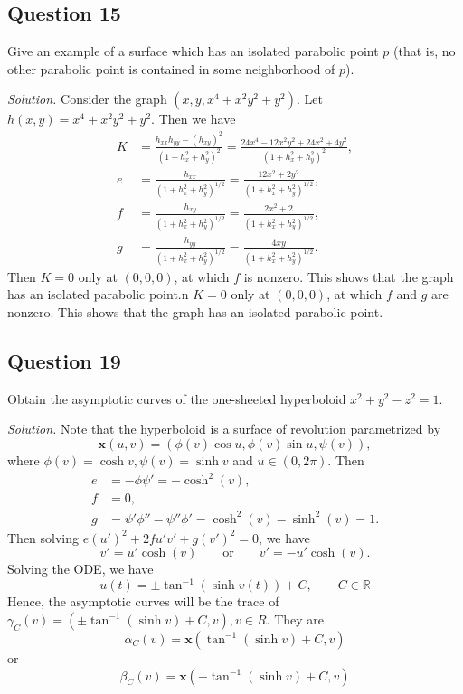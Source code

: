 \documentclass[12pt]{article}
\begin{document}
\subsection*{Question 15}
Give an example of a surface which has an isolated parabolic point $p$ (that is, no other parabolic point is contained in some neighborhood of $p$).

\textit{Solution.} Consider the graph $(x,y,x^4+x^2y^2+y^2)$. Let $h(x,y)=x^4+x^2y^2+y^2$. Then we have\begin{align*}
    K &= \frac{h_{xx}h_{yy}-(h_{xy})^2}{(1+h_x^2+h_y^2)^2} = \frac{24x^4-12x^2y^2+24x^2+4y^2}{(1+h_x^2+h_y^2)^2},\\
    e &= \frac{h_{xx}}{(1+h_x^2+h_y^2)^{1/2}}=\frac{12x^2+2y^2}{(1+h_x^2+h_y^2)^{1/2}},\\
    f &= \frac{h_{xy}}{(1+h_x^2+h_y^2)^{1/2}}=\frac{2x^2+2}{(1+h_x^2+h_y^2)^{1/2}},\\
    g &= \frac{h_{yy}}{(1+h_x^2+h_y^2)^{1/2}}=\frac{4xy}{(1+h_x^2+h_y^2)^{1/2}}.
\end{align*}
 Then $K=0$ only at $(0,0,0)$, at which $f$ is nonzero. This shows that the graph has an isolated parabolic point.n $K=0$ only at $(0,0,0)$, at which $f$ and $g$ are nonzero. This shows that the graph has an isolated parabolic point.
 
\subsection*{Question 19}
Obtain the asymptotic curves of the one-sheeted hyperboloid $x^2 + y^2 - z^2 = 1$.

\textit{Solution.} Note that the hyperboloid is a surface of revolution parametrized by \begin{equation*}
    \mathbf{x}(u,v) = (\phi(v)\cos{u},\phi(v)\sin{u},\psi(v)),
\end{equation*}
where $\phi(v) = \cosh{v},\psi(v)=\sinh{v}$ and $u\in(0,2\pi)$. Then\begin{align*}
    e &=  -\phi\psi'=-\cosh^2(v),\\
    f &= 0,\\
    g &= \psi'\phi''-\psi''\phi'=\cosh^2(v)-\sinh^2(v)=1.
\end{align*}
Then solving $e(u')^2 +2fu'v'+g(v')^2=0$, we have \begin{equation*}
    v'=u'\cosh(v) \qquad \text{or} \qquad v'=-u'\cosh(v).
\end{equation*}
Solving the ODE, we have \begin{equation*}
    u(t) = \pm \tan^{-1}(\sinh v(t)) + C,\qquad C\in \mathbb{R}
\end{equation*}
Hence, the asymptotic curves will be the trace of $\gamma_C(v) = (\pm\tan^{-1}( \sinh v)  + C,v), v\in R$. They are \begin{equation*}
    \alpha_C(v) = \mathbf{x}(\tan^{-1}( \sinh v)  + C,v)
\end{equation*} or \begin{equation*}
    \beta_C(v) = \mathbf{x}(-\tan^{-1}( \sinh v)  + C,v)
\end{equation*}
\end{document}
